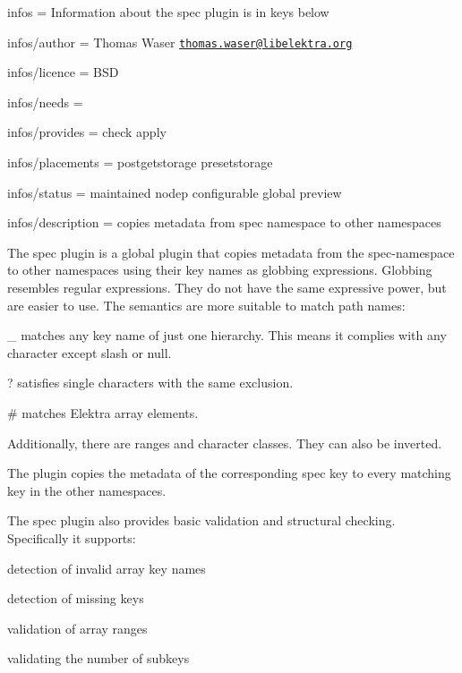 
\begin{DoxyItemize}
\item infos = Information about the spec plugin is in keys below
\item infos/author = Thomas Waser \href{mailto:thomas.waser@libelektra.org}{\tt thomas.\+waser@libelektra.\+org}
\item infos/licence = B\+SD
\item infos/needs =
\item infos/provides = check apply
\item infos/placements = postgetstorage presetstorage
\item infos/status = maintained nodep configurable global preview
\item infos/description = copies metadata from spec namespace to other namespaces
\end{DoxyItemize}

The spec plugin is a global plugin that copies metadata from the {\ttfamily spec}-\/namespace to other namespaces using their key names as globbing expressions. Globbing resembles regular expressions. They do not have the same expressive power, but are easier to use. The semantics are more suitable to match path names\+:


\begin{DoxyItemize}
\item {\ttfamily \+\_\+} matches any key name of just one hierarchy. This means it complies with any character except slash or null.
\item {\ttfamily ?} satisfies single characters with the same exclusion.
\item {\ttfamily \#} matches Elektra array elements.
\item Additionally, there are ranges and character classes. They can also be inverted.
\end{DoxyItemize}

The plugin copies the metadata of the corresponding {\ttfamily spec} key to every matching key in the other namespaces.

The spec plugin also provides basic validation and structural checking. Specifically it supports\+:


\begin{DoxyItemize}
\item detection of invalid array key names
\item detection of missing keys
\item validation of array ranges
\item validating the number of subkeys
\end{DoxyItemize}

